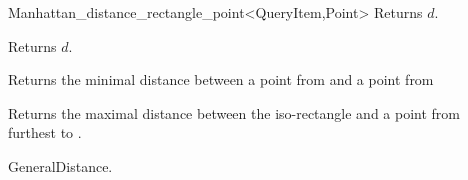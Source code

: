 \begin{ccRefClass}{Manhattan_distance_rectangle_point<QueryItem,Point>}
 {Returns $d$.}

 {Returns $d$.}


{Returns the minimal distance between a point from  and a point from
}

{Returns the maximal distance between the iso-rectangle  and
a point from  furthest to .}


\ccSeeAlso

GeneralDistance.

\end{ccRefClass}


